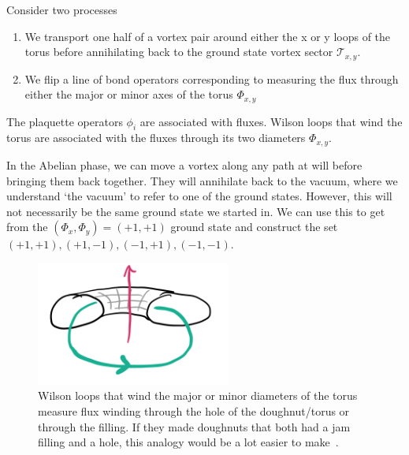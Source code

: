 Consider two processes

\begin{enumerate}
\def\labelenumi{\arabic{enumi})}
\item
  We transport one half of a vortex pair around either the x or y loops of the torus before annihilating back to the ground state vortex sector \(\mathcal{T}_{x,y}\).
\item
  We flip a line of bond operators corresponding to measuring the flux through either the major or minor axes of the torus \(\mathcal{\Phi}_{x,y}\)
\end{enumerate}

The plaquette operators \(\phi_i\) are associated with fluxes. Wilson loops that wind the torus are associated with the fluxes through its two diameters \(\mathcal{\Phi}_{x,y}\).

In the Abelian phase, we can move a vortex along any path at will before bringing them back together. They will annihilate back to the vacuum, where we understand `the vacuum' to refer to one of the ground states. However, this will not necessarily be the same ground state we started in. We can use this to get from the \((\Phi_x, \Phi_y) = (+1, +1)\) ground state and construct the set \((+1, +1), (+1, -1), (-1, +1), (-1, -1)\).

\hypertarget{fig:topological_fluxes}{%
\begin{figure}
\centering
\includegraphics[width=0.57\textwidth,height=\textheight]{figure_code/amk_chapter/topological_fluxes.png}
\caption[{Topological Fluxes}]{Wilson loops that wind the major or minor diameters of the torus measure flux winding through the hole of the doughnut/torus or through the filling. If they made doughnuts that both had a jam filling and a hole, this analogy would be a lot easier to make~\autocite{parkerWhyDoesThis}.}
\label{fig:topological_fluxes}
\end{figure}
}


